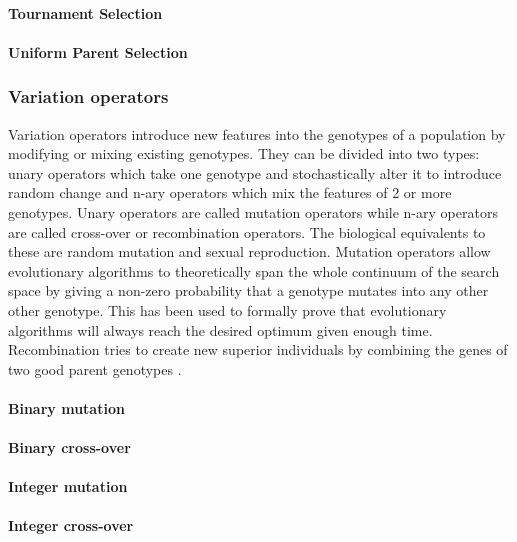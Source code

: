 \paragraph{Tournament Selection}

\paragraph{Uniform Parent Selection}



\subsubsection{Variation operators}

Variation operators introduce new features into the genotypes of a population by modifying or mixing existing genotypes. They can be divided into two types: unary operators which take one genotype and stochastically alter it to introduce random change and n-ary operators which mix the features of 2 or more genotypes. Unary operators are called mutation operators while n-ary operators are called cross-over or recombination operators. The biological equivalents to these are random mutation and sexual reproduction. Mutation operators allow evolutionary algorithms to theoretically span the whole continuum of the search space by giving a non-zero probability that a genotype mutates into any other other genotype. This has been used to formally prove that evolutionary algorithms will always reach the desired optimum given enough time. Recombination tries to create new superior individuals by combining the genes of two good parent genotypes \cite{Eiben2015_whatevolutionary, Eiben20021}.

\paragraph{Binary mutation}

\paragraph{Binary cross-over}

\paragraph{Integer mutation}

\paragraph{Integer cross-over}

